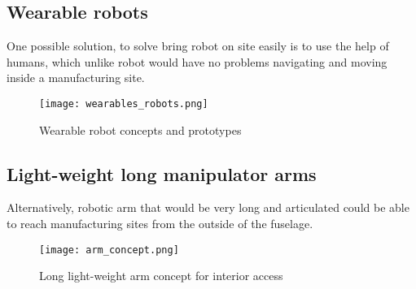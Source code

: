 \subsection{Wearable robots}
\label{sec:WearableRobots}

One possible solution, to solve bring robot on site easily is to use the help of humans, which unlike robot would have no problems navigating and moving inside a manufacturing site.

\begin{figure}[H]
	\centering
		\texttt{[image: wearables\_robots.png]}
		\caption{Wearable robot concepts and prototypes}
	\label{fig:wearable_concept}
\end{figure}


\subsection{Light-weight long manipulator arms}
\label{sec:LightWeightLongManipulatorArm}

Alternatively, robotic arm that would be very long and articulated could be able to reach manufacturing sites from the outside of the fuselage. 

\begin{figure}[H]
	\centering
		\texttt{[image: arm\_concept.png]}
		\caption{Long light-weight arm concept for interior access}
	\label{fig:arm_concept}
\end{figure}